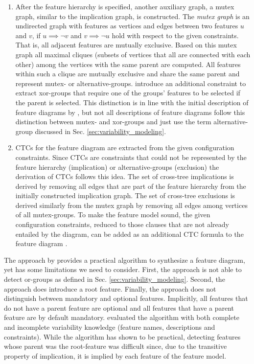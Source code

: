 \begin{enumerate}
  \item After the feature hierarchy is specified, another auxiliary graph, a
  mutex graph, similar to the implication graph, is constructed. The \emph{mutex
  graph} is an undirected graph with features as vertices and edges between two
  features $u$ and $v$, if $u \implies \neg{v}$ and $v \implies \neg{u}$ hold
  with respect to the given constraints. 
  That is, all adjacent features are mutually exclusive. Based on
  this mutex graph all maximal cliques (subsets of vertices that all are
  connected with each other) among the vertices with the same parent are
  computed. All features within such a clique are mutually exclusive and share
  the same parent and represent mutex- or alternative-groups. \cite{she_reverse_2011} introduce an
  additional constraint to extract xor-groups that require one of the groups’
  features to be selected if the parent is selected. This distinction is in
  line with the initial description of feature diagrams by \cite{kang_feature-oriented_1990},
  but not all descriptions of feature diagrams follow this distinction between
  mutex- and xor-groups and just use the term alternative-group discussed in 
  Sec. \ref{sec:variability_modeling}. %
  
  \item CTCs for the feature diagram are extracted from
  the given configuration constraints. Since CTCs are constraints that could
  not be represented by the feature hierarchy (implication) or
  alternative-groups (exclusion) the derivation of CTCs follows this idea. The
  set of cross-tree implications is derived by removing all edges that are part
  of the feature hierarchy from the initially constructed implication graph.
  The set of cross-tree exclusions is derived similarly from the mutex
  graph by removing all edges among vertices of all mutex-groups. To make the
  feature model sound, the given configuration constraints, reduced to those
  clauses that are not already entailed by the diagram, can be added as an
  additional CTC formula to the feature diagram \citep{she_reverse_2011}.
\end{enumerate}

The approach by \cite{she_reverse_2011} provides a practical algorithm to synthesize a
feature diagram, yet has some limitations we need to consider. First, the
approach is not able to detect or-groups as defined in Sec. \ref{sec:variability_modeling}.
Second, the approach does introduce a root feature. Finally, the approach does not
distinguish between mandatory and optional features. Implicitly, all features
that do not have a parent feature are optional and all features that have a
parent feature are by default mandatory. \cite{she_reverse_2011} evaluated the
algorithm with both complete and incomplete variability knowledge (feature
names, descriptions and constraints). While the algorithm has shown to be
practical, detecting features whose parent was the root-feature was difficult
since, due to the transitive property of implication, it is implied by each
feature of the feature model.

